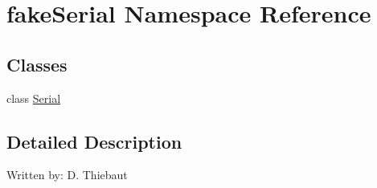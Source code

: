 \hypertarget{namespacefake_serial}{}\section{fake\+Serial Namespace Reference}
\label{namespacefake_serial}
\subsection*{Classes}
\begin{DoxyCompactItemize}
\item 
class \mbox{\hyperlink{classfake_serial_1_1_serial}{Serial}}
\end{DoxyCompactItemize}


\subsection{Detailed Description}
\begin{DoxyVerb}Written by:
D. Thiebaut
\end{DoxyVerb}
 